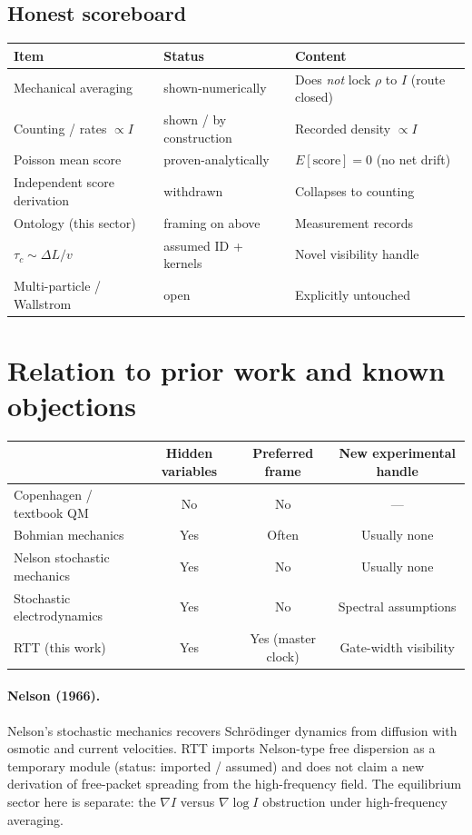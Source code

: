 \documentclass[11pt]{article}
\begin{document}
\subsection{Honest scoreboard}
\begin{center}
\begin{tabular}{@{}lll@{}}
\toprule
Item & Status & Content \\
\midrule
Mechanical averaging & shown-numerically & Does \emph{not} lock $\rho$ to $I$ (route closed) \\
Counting / rates $\propto I$ & shown / by construction & Recorded density $\propto I$ \\
Poisson mean score & proven-analytically & $E[\mathrm{score}]=0$ (no net drift) \\
Independent score derivation & withdrawn & Collapses to counting \\
Ontology (this sector) & framing on above & Measurement records \\
$\tau_c\sim\Delta L/v$ & assumed ID + kernels & Novel visibility handle \\
Multi-particle / Wallstrom & open & Explicitly untouched \\
\bottomrule
\end{tabular}
\end{center}

\section{Relation to prior work and known objections}

\begin{center}
\begin{tabular}{@{}lccc@{}}
\toprule
 & Hidden variables & Preferred frame & New experimental handle \\
\midrule
Copenhagen / textbook QM & No & No & --- \\
Bohmian mechanics & Yes & Often & Usually none \\
Nelson stochastic mechanics & Yes & No & Usually none \\
Stochastic electrodynamics & Yes & No & Spectral assumptions \\
RTT (this work) & Yes & Yes (master clock) & Gate-width visibility \\
\bottomrule
\end{tabular}
\end{center}

\paragraph{Nelson (1966).}
Nelson's stochastic mechanics \cite{nelson} recovers Schr\"odinger dynamics from diffusion with osmotic and current velocities.
RTT imports Nelson-type free dispersion as a temporary module (status: imported / assumed) and does not claim a new derivation of free-packet spreading from the high-frequency field.
The equilibrium sector here is separate: the $\nabla I$ versus $\nabla\log I$ obstruction under high-frequency averaging.
\end{document}
